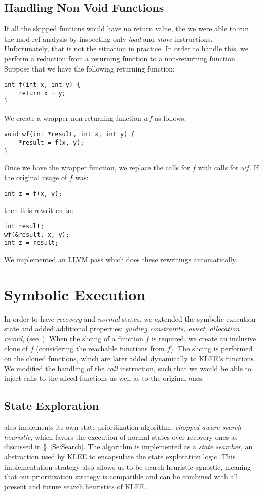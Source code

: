 \subsection{Handling Non Void Functions}
If all the skipped funtions would have no return value,
the we were able to run the mod-ref analysis by inspecting only \textit{load} and \textit{store} instructions.
Unfortunately, that is not the situation in practice.
In order to handle this, we perform a reduction from a returning function to a non-returning function.
Suppose that we have the following returning function:
\begin{lstlisting}[linewidth=.4\textwidth,numbers=none]
int f(int x, int y) {
    return x + y;
}
\end{lstlisting}
\label{fig:ret2void-original}
We create a wrapper non-returning function $wf$ as follows:
\begin{lstlisting}[linewidth=.4\textwidth,numbers=none]
void wf(int *result, int x, int y) {
    *result = f(x, y);
}
\end{lstlisting}
\label{fig:ret2void-original}
Once we have the wrapper function, we replace the calls for $f$ with calls for $wf$.
If the original usage of $f$ was:
\begin{lstlisting}[linewidth=.4\textwidth,numbers=none]
int z = f(x, y);
\end{lstlisting}
then it is rewritten to:
\begin{lstlisting}[linewidth=.4\textwidth,numbers=none]
int result;
wf(&result, x, y);
int z = result;
\end{lstlisting}
We implemented an LLVM pass which does these rewritings automatically.

\section{Symbolic Execution}
In order to have \textit{recovery} and \textit{normal} states,
we extended the symbolic execution state
and added additional properties: \textit{guiding constraints, owset, allocation record}, \etc (see~).
When the slicing of a function $f$ is required,
we create an inclusive clone of $f$ (considering the reachable functions from $f$).
The slicing is performed on the cloned functions, which are later added dynamically to KLEE's functions.
We modified the handling of the \textit{call} instruction,
such that we would be able to inject calls to the sliced functions as well as to the original ones.


\subsection{State Exploration}
\toolname also implements its own state
prioritization algorithm, \textit{chopped-aware search heuristic},
which favors the execution of normal states over recovery ones as
discussed in \S~\ref{Se:Search}. The algorithm is implemented as a
\textit{state searcher}, an abstraction used by KLEE to encapsulate
the state exploration logic. This implementation strategy also allows
us to be search-heuristic agnostic, meaning that our prioritization
strategy is compatible and can be combined with all present and future
search heuristics of KLEE.


